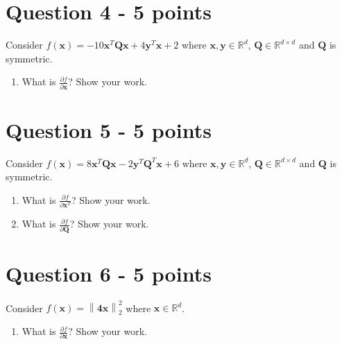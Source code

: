 \documentclass[11pt]{article}
\begin{document}
\section*{Question 4 - 5 points}
Consider $f(\mathbf{x}) = -10\mathbf{x}^T\mathbf{Q}\mathbf{x} + 4\mathbf{y}^T\mathbf{x} + 2$ where $\mathbf{x}, \mathbf{y} \in \mathbb{R}^d$, $\mathbf{Q} \in \mathbb{R}^{d\times d}$ and $\mathbf{Q}$ is symmetric.
 \begin{enumerate} 
\item What is $\frac{\partial f}{\partial\mathbf{x}}$?  Show your work. 
\end{enumerate}

\section*{Question 5 - 5 points}
Consider $f(\mathbf{x}) = 8\mathbf{x}^T\mathbf{Q}\mathbf{x} - 2\mathbf{y}^T\mathbf{Q}^T\mathbf{x} + 6$ where $\mathbf{x}, \mathbf{y} \in \mathbb{R}^d$, $\mathbf{Q} \in \mathbb{R}^{d\times d}$ and $\mathbf{Q}$ is symmetric.
\begin{enumerate} 
\item What is $\frac{\partial f}{\partial\mathbf{x}^T}$?  Show your work.
\item What is $\frac{\partial f}{\partial\mathbf{Q}}$?  Show your work. 
\end{enumerate}

\section*{Question 6 - 5 points}
Consider $f(\mathbf{x}) = \left\|\mathbf{4x}\right\|_{2}^{2}$ where $\mathbf{x} \in \mathbb{R}^d$. \begin{enumerate} 
\item What is $\frac{\partial f}{\partial\mathbf{x}}$?  Show your work. 
\end{enumerate}
\end{document}
